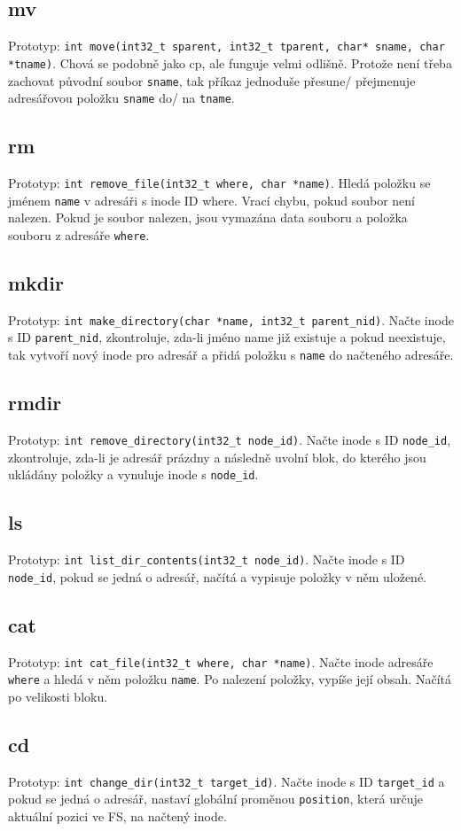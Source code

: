 \documentclass[12pt]{report}
\begin{document}
\subsection{mv}
Prototyp: \texttt{int move(int32\_t sparent, int32\_t tparent, char* sname, char *tname)}. Chová se
podobně jako cp, ale funguje velmi odlišně. Protože není třeba zachovat původní soubor \texttt{sname}, tak příkaz
jednoduše přesune/ přejmenuje adresářovou položku \texttt{sname} do/ na \texttt{tname}.
\subsection{rm}
Prototyp: \texttt{int remove\_file(int32\_t where, char *name)}. Hledá položku se jménem
\texttt{name} v adresáři s inode ID where. Vrací chybu, pokud soubor není nalezen. Pokud je soubor nalezen,
jsou vymazána data souboru a položka souboru z adresáře \texttt{where}.
\subsection{mkdir}
Prototyp: \texttt{int make\_directory(char *name, int32\_t parent\_nid)}. Načte inode s ID \texttt{parent\_nid},
zkontroluje, zda-li jméno name již existuje a pokud neexistuje, tak vytvoří nový inode pro adresář a přidá
položku s \texttt{name} do načteného adresáře.
\subsection{rmdir}
Prototyp: \texttt{int remove\_directory(int32\_t node\_id)}. Načte inode s ID \texttt{node\_id}, zkontroluje,
zda-li je adresář prázdny a následně uvolní blok, do kterého jsou ukládány položky a vynuluje inode s \texttt{node\_id}.
\subsection{ls}
Prototyp: \texttt{int list\_dir\_contents(int32\_t node\_id)}. Načte inode s ID \texttt{node\_id}, pokud se
jedná o adresář, načítá a vypisuje položky v něm uložené.
\subsection{cat}
Prototyp: \texttt{int cat\_file(int32\_t where, char *name)}. Načte inode adresáře \texttt{where} a hledá v něm 
položku \texttt{name}. Po nalezení položky, vypíše její obsah. Načítá po velikosti bloku.
\subsection{cd}
Prototyp: \texttt{int change\_dir(int32\_t target\_id)}. Načte inode s ID \texttt{target\_id} a pokud se jedná
o adresář, nastaví globální proměnou \texttt{position}, která určuje aktuální pozici ve FS, na načtený inode.
\end{document}
